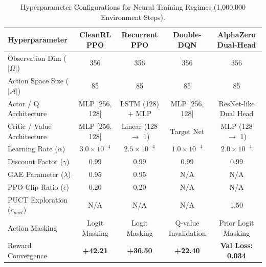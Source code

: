 \begin{table}[htbp]
\centering
\small
\caption{Hyperparameter Configurations for Neural Training Regimes (1,000,000 Environment Steps).}
\label{tab:training_hyperparams}
\begin{tabular}{lcccc}
\toprule
\textbf{Hyperparameter} & \textbf{CleanRL PPO} & \textbf{Recurrent PPO} & \textbf{Double-DQN} & \textbf{AlphaZero Dual-Head} \\
\midrule
Observation Dim ($|\Omega|$) & 356 & 356 & 356 & 356 \\
Action Space Size ($|\mathcal{A}|$) & 85 & 85 & 85 & 85 \\
Actor / Q Architecture & MLP [256, 128] & LSTM (128) + MLP & MLP [256, 128] & ResNet-like Dual Head \\
Critic / Value Architecture & MLP [256, 128] & Linear (128 $\to$ 1) & Target Net & MLP (128 $\to$ 1) \\
Learning Rate ($\alpha$) & $3.0 \times 10^{-4}$ & $2.5 \times 10^{-4}$ & $1.0 \times 10^{-4}$ & $2.0 \times 10^{-4}$ \\
Discount Factor ($\gamma$) & 0.99 & 0.99 & 0.99 & 0.99 \\
GAE Parameter ($\lambda$) & 0.95 & 0.95 & N/A & N/A \\
PPO Clip Ratio ($\epsilon$) & 0.20 & 0.20 & N/A & N/A \\
PUCT Exploration ($c_{puct}$) & N/A & N/A & N/A & 1.50 \\
Action Masking & Logit Masking & Logit Masking & Q-value Invalidation & Prior Logit Masking \\
Reward Convergence & \textbf{+42.21} & \textbf{+36.50} & \textbf{+22.40} & \textbf{Val Loss: 0.034} \\
\bottomrule
\end{tabular}
\end{table}
